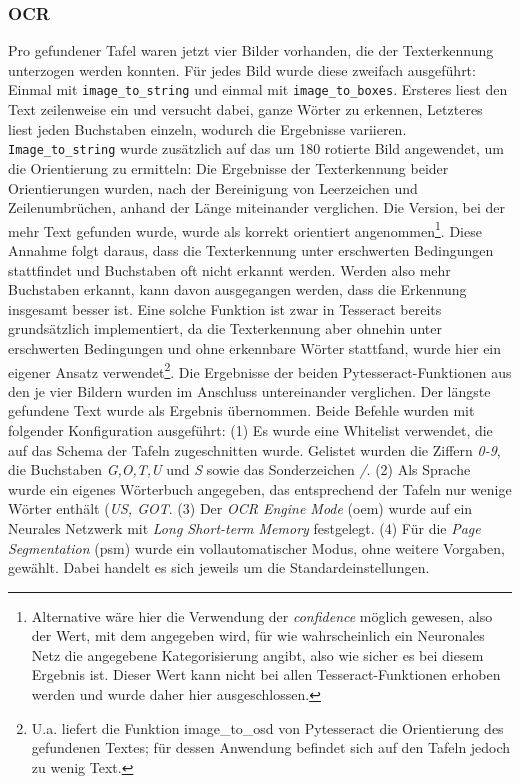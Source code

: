 \subsubsection{OCR}

Pro gefundener Tafel waren jetzt vier Bilder vorhanden, die der Texterkennung unterzogen werden konnten. Für jedes Bild wurde diese zweifach ausgeführt: Einmal mit \verb|image_to_string| und einmal mit \verb|image_to_boxes|. Ersteres liest den Text zeilenweise ein und versucht dabei, ganze Wörter zu erkennen, Letzteres liest jeden Buchstaben einzeln, wodurch die Ergebnisse variieren. \verb|Image_to_string| wurde zusätzlich auf das um 180\degree{} rotierte Bild angewendet, um die Orientierung zu ermitteln: Die Ergebnisse der Texterkennung beider Orientierungen wurden, nach der Bereinigung von Leerzeichen und Zeilenumbrüchen, anhand der Länge miteinander verglichen. Die Version, bei der mehr Text gefunden wurde, wurde als korrekt orientiert angenommen\footnote{Alternative wäre hier die Verwendung der \textit{confidence} möglich gewesen, also der Wert, mit dem angegeben wird, für wie wahrscheinlich ein Neuronales Netz die angegebene Kategorisierung angibt, also wie sicher es bei diesem Ergebnis ist. Dieser Wert kann nicht bei allen Tesseract-Funktionen erhoben werden und wurde daher hier ausgeschlossen.}. Diese Annahme folgt daraus, dass die Texterkennung unter erschwerten Bedingungen stattfindet und Buchstaben oft nicht erkannt werden. Werden also mehr Buchstaben erkannt, kann davon ausgegangen werden, dass die Erkennung insgesamt besser ist. Eine solche Funktion ist zwar in Tesseract bereits grundsätzlich implementiert, da die Texterkennung aber ohnehin unter erschwerten Bedingungen und ohne erkennbare Wörter stattfand, wurde hier ein eigener Ansatz verwendet\footnote{U.a. liefert die Funktion image\_to\_osd von Pytesseract die Orientierung des gefundenen Textes; für dessen Anwendung befindet sich auf den Tafeln jedoch zu wenig Text.}.
Die Ergebnisse der beiden Pytesseract-Funktionen aus den je vier Bildern wurden im Anschluss untereinander verglichen. Der längste gefundene Text wurde als Ergebnis übernommen.
Beide Befehle wurden mit folgender Konfiguration ausgeführt: (1) Es wurde eine Whitelist verwendet, die auf das Schema der Tafeln zugeschnitten wurde. Gelistet wurden die Ziffern \textit{0-9}, die Buchstaben \textit{G,O,T,U} und \textit{S} sowie das Sonderzeichen \textit{/}. (2) Als Sprache wurde ein eigenes Wörterbuch angegeben, das entsprechend der Tafeln nur wenige Wörter enthält (\textit{US, GOT}. (3) Der \textit{OCR Engine Mode} (oem) wurde auf ein Neurales Netzwerk mit \textit{Long Short-term Memory} \cite{hochreitersepp}{} festgelegt. (4) Für die \textit{Page Segmentation} (psm) wurde ein vollautomatischer Modus, ohne weitere Vorgaben, gewählt. Dabei handelt es sich jeweils um die Standardeinstellungen.

